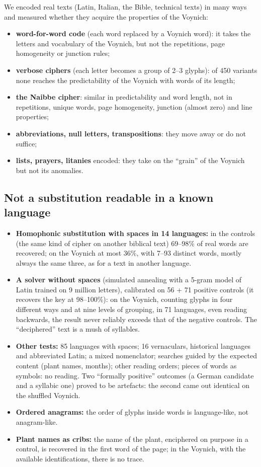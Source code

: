 We encoded real texts (Latin, Italian, the Bible, technical texts) in many ways and measured whether they acquire the
properties of the Voynich:
\begin{itemize}
\item \textbf{word-for-word code} (each word replaced by a Voynich word): it takes the letters and vocabulary of the
  Voynich, but not the repetitions, page homogeneity or junction rules;
\item \textbf{verbose ciphers} (each letter becomes a group of 2--3 glyphs): of 450 variants none reaches the
  predictability of the Voynich with words of its length;
\item \textbf{the Naibbe cipher}: similar in predictability and word length, not in repetitions, unique words, page
  homogeneity, junction (almost zero) and line properties;
\item \textbf{abbreviations, null letters, transpositions}: they move away or do not suffice;
\item \textbf{lists, prayers, litanies} encoded: they take on the ``grain'' of the Voynich but not its anomalies.
\end{itemize}

\subsection{Not a substitution readable in a known language}

\begin{itemize}
\item \textbf{Homophonic substitution with spaces in 14 languages:} in the controls (the same kind of cipher on another
  biblical text) 69--98\% of real words are recovered; on the Voynich at most 36\%, with 7--93 distinct words, mostly
  always the same three, as for a text in another language.
\item \textbf{A solver without spaces} (simulated annealing with a 5-gram model of Latin trained on 9 million letters),
  calibrated on 56 + 71 positive controls (it recovers the key at 98--100\%): on the Voynich, counting glyphs in four
  different ways and at nine levels of grouping, in 71 languages, even reading backwards, the result never reliably
  exceeds that of the negative controls. The ``deciphered'' text is a mush of syllables.
\item \textbf{Other tests:} 85 languages with spaces; 16 vernaculars, historical languages and abbreviated Latin; a mixed
  nomenclator; searches guided by the expected content (plant names, months); other reading orders; pieces of words as
  symbols: no reading. Two ``formally positive'' outcomes (a German candidate and a syllabic one) proved to be artefacts:
  the second came out identical on the shuffled Voynich.
\item \textbf{Ordered anagrams:} the order of glyphs inside words is language-like, not anagram-like.
\item \textbf{Plant names as cribs:} the name of the plant, enciphered on purpose in a control, is recovered in the first
  word of the page; in the Voynich, with the available identifications, there is no trace.
\end{itemize}

